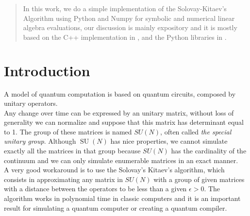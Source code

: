\documentclass[a0,portrait]{a0poster}
\begin{document}
\begin{multicols}{2} %


\color{Navy} %

\begin{abstract}
	In this work, we do a simple implementation of the Solovay-Kitaev's Algorithm using Python and Numpy for symbolic and numerical linear algebra evaluations, our discussion is mainly expository and it is mostly based on the C++ implementation in \cite{Harrow2001}, and the Python libraries in \cite{PaulPhamGit}.
\end{abstract}


\color{SaddleBrown} %

\section*{Introduction}

\large{A} model of quantum computation is based on quantum circuits, composed by unitary operators.
\\
Any change over time can be expressed by an unitary matrix, without loss of generality we can normalize and suppose that this matrix has determinant equal to 1. The group of these matrices is named $SU(N)$, often called \emph{the special unitary group}. Although $ \operatorname{SU}(N)  $ has nice properties, we cannot simulate exactly all the matrices in that group because $SU(N)$ has the cardinality of the continuum \cite{Nielsen2000} and we can only simulate enumerable matrices in an exact manner.
\\
A very good workaround is to use the Solovay's Kitaev's algorithm, which consists in approximating any matrix in $SU(N)$ with a group of given matrices with a distance between the operators to be less than a given $\epsilon>0$. The algorithm works in polynomial time in classic computers and it is an important result for simulating a quantum computer or creating a quantum compiler.


\end{multicols}
\end{document}
